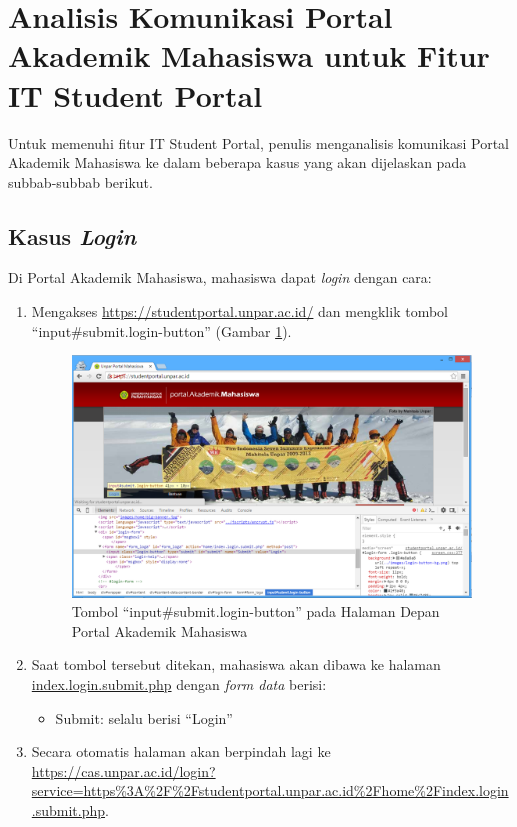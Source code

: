 \section{Analisis Komunikasi Portal Akademik Mahasiswa untuk Fitur IT Student Portal}
Untuk memenuhi fitur IT Student Portal, penulis menganalisis komunikasi Portal Akademik Mahasiswa ke dalam beberapa kasus yang akan dijelaskan pada subbab-subbab berikut.

\subsection{Kasus \textit{Login}}
Di Portal Akademik Mahasiswa, mahasiswa dapat \textit{login} dengan cara:
\begin{enumerate}
	\item Mengakses \url{https://studentportal.unpar.ac.id/} dan mengklik tombol ``input\#submit.login-button'' (Gambar \ref{fig:3_case_login}).
	\begin{figure}[H]
			\centering
			\includegraphics[scale=0.5]{Gambar/case-login}
			\caption{Tombol ``input\#submit.login-button'' pada Halaman Depan Portal Akademik Mahasiswa} 
			\label{fig:3_case_login}
		\end{figure}
		
	\item Saat tombol tersebut ditekan, mahasiswa akan dibawa ke halaman \url{index.login.submit.php} dengan \textit{form data} berisi:
			\begin{itemize}
				\item Submit: selalu berisi ``Login''
			\end{itemize}
		
	\item Secara otomatis halaman akan berpindah lagi ke \url{https://cas.unpar.ac.id/login? service=https\%3A\%2F\%2Fstudentportal.unpar.ac.id\%2Fhome\%2Findex.login.submit.php}.
		

\end{enumerate}
